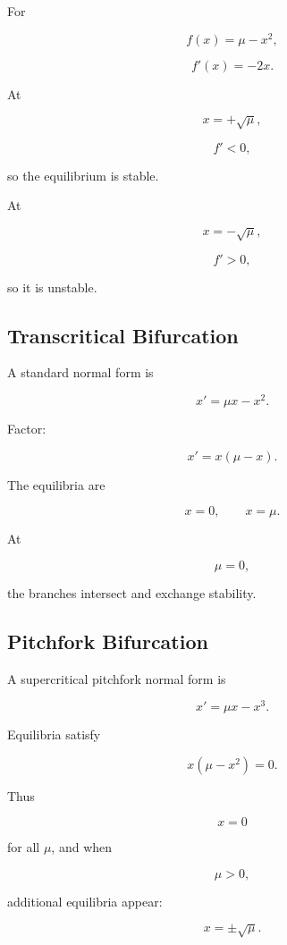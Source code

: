 For

\[
f(x)=\mu-x^2,
\]

\[
f'(x)=-2x.
\]

At

\[
x=+\sqrt{\mu},
\]

\[
f'<0,
\]

so the equilibrium is stable.

At

\[
x=-\sqrt{\mu},
\]

\[
f'>0,
\]

so it is unstable.

\subsection{Transcritical Bifurcation}
\label{subsec:transcritical-bifurcation}

A standard normal form is

\[
\boxed{
x'
=
\mu x-x^2.
}
\]

Factor:

\[
\boxed{
x'
=
x(\mu-x).
}
\]

The equilibria are

\[
\boxed{
x=0,
\qquad
x=\mu.
}
\]

At

\[
\mu=0,
\]

the branches intersect and exchange stability.

\subsection{Pitchfork Bifurcation}
\label{subsec:pitchfork-bifurcation}

A supercritical pitchfork normal form is

\[
\boxed{
x'
=
\mu x-x^3.
}
\]

Equilibria satisfy

\[
x
(
\mu-x^2
)
=
0.
\]

Thus

\[
\boxed{
x=0
}
\]

for all \(\mu\), and when

\[
\mu>0,
\]

additional equilibria appear:

\[
\boxed{
x=\pm\sqrt{\mu}.
}
\]

